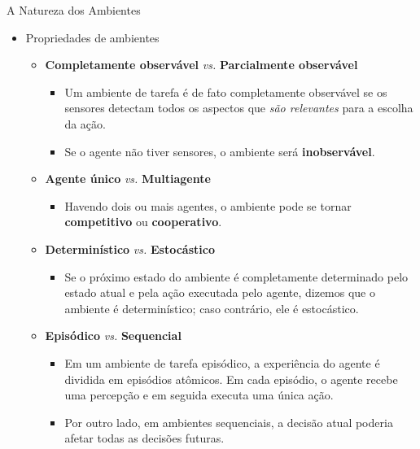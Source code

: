 \documentclass{libs/ufc_format}
\begin{document}
\begin{frame}{A Natureza dos Ambientes}
    \begin{itemize}
        \item Propriedades de ambientes
            \begin{itemize}
                \justifying
                \item \textbf{Completamente observável} \textit{vs.} \textbf{Parcialmente observável}
                    \begin{itemize}
                        \justifying
                        \item<1> Um ambiente de tarefa é de fato completamente observável se os sensores detectam todos os aspectos que \textit{são relevantes} para a escolha da ação.
                        \item<1> Se o agente não tiver sensores, o ambiente será \textbf{inobservável}.
                    \end{itemize}
                \item<2-> \textbf{Agente único} \textit{vs.} \textbf{Multiagente}
                    \begin{itemize}
                        \justifying
                        \item<2> Havendo dois ou mais agentes, o ambiente pode se tornar \textbf{competitivo} ou \textbf{cooperativo}.
                    \end{itemize}
                \item<3-> \textbf{Determinístico} \textit{vs.} \textbf{Estocástico}
                    \begin{itemize}
                        \justifying
                        \item<3> Se o próximo estado do ambiente é completamente determinado pelo estado atual e pela ação executada pelo agente, dizemos que o ambiente é determinístico; caso contrário, ele é estocástico.
                    \end{itemize}
                \item<4> \textbf{Episódico} \textit{vs.} \textbf{Sequencial}
                    \begin{itemize}
                        \justifying
                        \item<4> Em um ambiente de tarefa episódico, a experiência do agente é dividida em episódios atômicos. Em cada episódio, o agente recebe uma percepção e em seguida executa uma única ação.
                        \item<4> Por outro lado, em ambientes sequenciais, a decisão atual poderia afetar todas as decisões futuras.
                    \end{itemize}
            \end{itemize}
    \end{itemize}
\end{frame}
\end{document}
